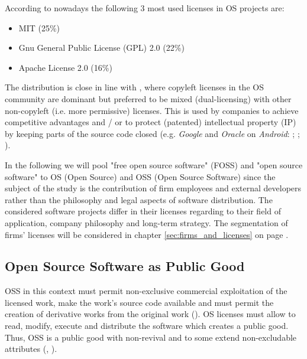 According to \cite{top20oslicenses:online} nowadays the following 3 most used licenses in OS projects are:

\begin{itemize}
	\item MIT (25\%)
  \item Gnu General Public License (GPL) 2.0 (22\%)
  \item Apache License 2.0 (16\%)
\end{itemize}

The distribution is close in line with \cite{bonaccorsi2003licensing}, where copyleft licenses in the OS community are dominant but preferred to be mixed (dual-licensing) with other non-copyleft (i.e. more permissive) licenses. This is used by companies to achieve competitive advantages and / or to protect (patented) intellectual property (IP) by keeping parts of the source code closed (e.g. \textit{Google} and \textit{Oracle} on \textit{Android}: \cite{GooglesIronGripOnAndroid:online}; \cite{OracleSinksItsClawsIntoAndroid:online}; \cite{SunOracleAndroidGoogleAndJDKCopyleftFUD:online}).

In the following we will pool "free open source software" (FOSS) and "open source software" to OS (Open Source) and OSS (Open Source Software) since the subject of the study is the contribution of firm employees and external developers rather than the philosophy and legal aspects of software distribution. The considered software projects differ in their licenses regarding to their field of application, company philosophy and long-term strategy. The segmentation of firms' licenses will be considered in chapter \ref{sec:firms_and_licenses} on page \pageref{sec:firms_and_licenses}.

\subsection{Open Source Software as Public Good}

OSS in this context must permit non-exclusive commercial exploitation of the licensed work, make the work's source code available and must permit the creation of derivative works from the original work  (\cite{laurent2004understanding}). OS licenses must allow to read, modify, execute and distribute the software which creates a public good. Thus, OSS is a public good with non-revival and to some extend non-excludable attributes (\cite[p.6]{eilhard2009open},  \cite{lerner2000simple}).

